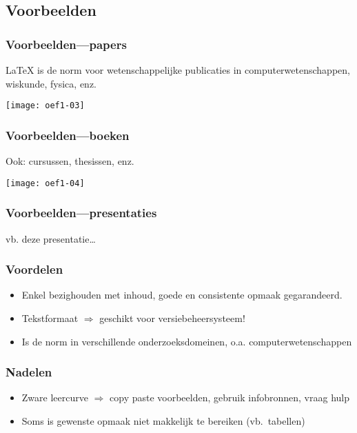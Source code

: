 \documentclass[aspectratio=169]{beamer}
\begin{document}
\subsection{Voorbeelden}

\begin{frame}
  \frametitle{Voorbeelden---papers}
  
  {\LaTeX} is de norm voor wetenschappelijke publicaties in computerwetenschappen, wiskunde, fysica, enz.
  
  \begin{center}
    \texttt{[image: oef1-03]}
  \end{center}
  
\end{frame}

\begin{frame}
  \frametitle{Voorbeelden---boeken}
  
  Ook: cursussen, thesissen, enz.
  
  \begin{center}
    \texttt{[image: oef1-04]}
  \end{center}
  
\end{frame}

\begin{frame}
  \frametitle{Voorbeelden---presentaties}
  
  \begin{center}
    vb. deze presentatie\ldots
  \end{center}
  
\end{frame}

\begin{frame}
  \frametitle{Voordelen}
  
  \begin{itemize}
    \item<+-> Enkel bezighouden met inhoud, goede en consistente opmaak gegarandeerd.
    \item<+-> Tekstformaat $\Rightarrow$ geschikt voor versiebeheersysteem!
    \item<+-> Is de norm in verschillende onderzoeksdomeinen, o.a. computerwetenschappen
  \end{itemize}
\end{frame}


\begin{frame}
  \frametitle{Nadelen}
  
  \begin{itemize}
    \item<+-> Zware leercurve $\Rightarrow$ copy paste voorbeelden, gebruik infobronnen, vraag hulp
    \item<+-> Soms is gewenste opmaak niet makkelijk te bereiken (vb.~tabellen)
  \end{itemize}
  
\end{frame}
\end{document}
